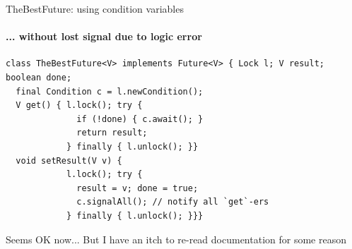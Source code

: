 % 

%
%


\begin{frame}[fragile]{TheBestFuture: using condition variables}
\framesubtitle{... without lost signal due to logic error}

\begin{verbatim}
class TheBestFuture<V> implements Future<V> { Lock l; V result; boolean done;
  final Condition c = l.newCondition();
  V get() { l.lock(); try {
              if (!done) { c.await(); }
              return result; 
            } finally { l.unlock(); }}
  void setResult(V v) { 
            l.lock(); try { 
              result = v; done = true;
              c.signalAll(); // notify all `get`-ers
            } finally { l.unlock(); }}}
\end{verbatim}

\pause Seems OK now... \pause But I have an itch to re-read documentation for some reason
\end{frame}

